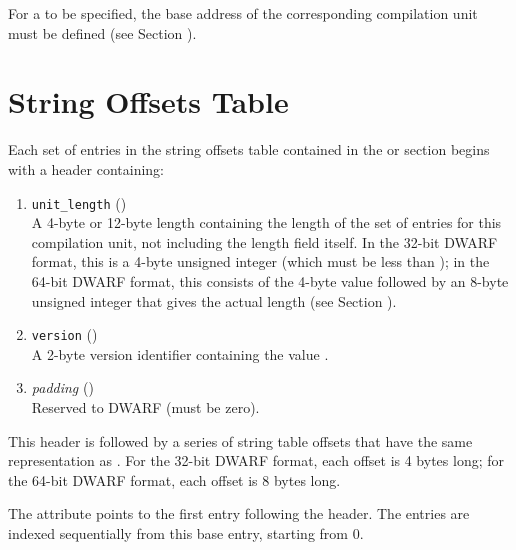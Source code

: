 For a  to be specified, the base address of the
corresponding compilation unit must be defined 
(see Section ).

\section{String Offsets Table}
\label{chap:stringoffsetstable}
Each set of entries in the string offsets table contained in the
\dotdebugstroffsets{} or \dotdebugstroffsetsdwo{}
section begins with a header containing:
\begin{enumerate}[1. ]
\item \texttt{unit\_length} () \\
A 4-byte or 12-byte length containing the length of
the set of entries for this compilation unit, not
including the length field itself. In the 32-bit
DWARF format, this is a 4-byte unsigned integer
(which must be less than \xfffffffzero); in the 64-bit
DWARF format, this consists of the 4-byte value
\wffffffff followed by an 8-byte unsigned integer
that gives the actual length (see 
Section ).

\item  \texttt{version} (\HFTuhalf) \\
A 2-byte version identifier containing the value
\versiondotdebugstroffsets{}.

\item \textit{padding} (\HFTuhalf) \\
Reserved to DWARF (must be zero).
\end{enumerate}

This header is followed by a series of string table offsets
that have the same representation as \DWFORMstrp.
For the 32-bit DWARF format, each offset is 4 bytes long; for
the 64-bit DWARF format, each offset is 8 bytes long.

The \DWATstroffsetsbase{} attribute points to the first
entry following the header. The entries are indexed
sequentially from this base entry, starting from 0.

